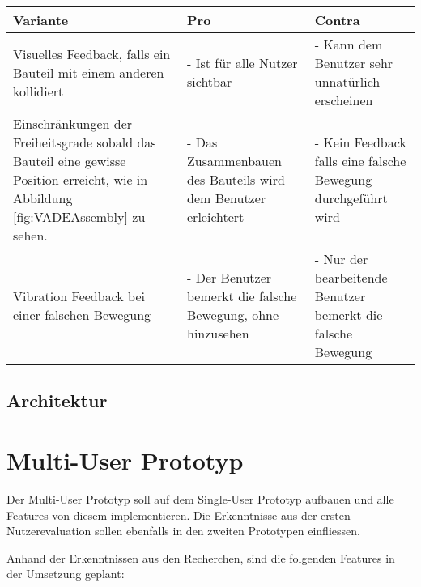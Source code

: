 \begin{center}
	\begin{tabularx} {\textwidth} { |X|X|X| }
		\hline
		\rowcolor{black}
		\color{white} \textbf{Variante} & \color{white} \textbf{Pro} & 
		\color{white} \textbf{Contra} \\
		\hline
		Visuelles Feedback, falls ein Bauteil mit einem anderen kollidiert & - Ist für alle Nutzer sichtbar & - Kann dem Benutzer sehr unnatürlich erscheinen \\
		\hline
		Einschränkungen der Freiheitsgrade sobald das Bauteil eine gewisse Position erreicht, wie in Abbildung \ref{fig:VADEAssembly} zu sehen. & - Das Zusammenbauen des Bauteils wird dem Benutzer erleichtert & - Kein Feedback falls eine falsche Bewegung durchgeführt wird \\
		\hline
		Vibration Feedback bei einer falschen Bewegung & - Der Benutzer bemerkt die falsche Bewegung, ohne hinzusehen & - Nur der bearbeitende Benutzer bemerkt die falsche Bewegung \\
		\hline	
	\end{tabularx}
\end{center}
\label{tbl:varianten_zusammenbau}

\subsection{Architektur}

\section{Multi-User Prototyp}
Der Multi-User Prototyp soll auf dem Single-User Prototyp aufbauen und alle Features von diesem implementieren. Die Erkenntnisse aus der ersten Nutzerevaluation sollen ebenfalls in den zweiten Prototypen einfliessen.

Anhand der Erkenntnissen aus den Recherchen, sind die folgenden Features in der Umsetzung geplant:


